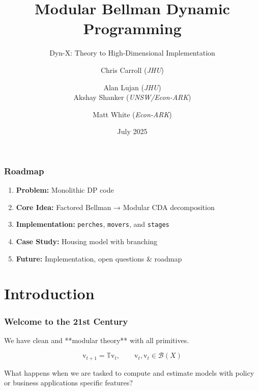\documentclass[10pt]{beamer}
\title{Modular Bellman Dynamic Programming}
\subtitle{Dyn-X: Theory to High‑Dimensional Implementation}
\author[Carroll, Lujan, Shanker, White]{
  Chris Carroll (\textit{JHU}) \and Alan Lujan (\textit{JHU}) \\[0.5em]
  Akshay Shanker (\textit{UNSW/Econ-ARK}) \and Matt White (\textit{Econ-ARK})
}
\institute{\vspace{1.5em}CEF 2025}
\date{July 2025}
\begin{document}
\begin{frame}
  \titlepage
\end{frame}

\begin{frame}
  \frametitle{Roadmap}
  \begin{enumerate}
    \item \textbf{Problem:} Monolithic DP code
    \item \textbf{Core Idea:} Factored Bellman → Modular CDA decomposition
    \item \textbf{Implementation:} \texttt{perches}, \texttt{movers}, and \texttt{stages}
    \item \textbf{Case Study:} Housing model with branching
    \item \textbf{Future:} Implementation, open questions \& roadmap
  \end{enumerate}
\end{frame}

\section{Introduction}

\begin{frame}
  \frametitle{Welcome to the 21st Century}

  \vspace{2em}
  We have clean and **modular theory** with all primitives. 

  \vspace{0.75em}
  \begin{equation*}
     \mathrm{v}_{t+1} = \mathbb T \mathrm{v}_{t}, \qquad \mathrm{v}_{t}, \mathrm{v}_{t}\in \mathcal{B}(X)
  \end{equation*}

  \vspace{2em}
  What happens when we are tasked to compute and estimate models with policy or business  applications 
  specific features? 

\end{frame}
\end{document}
